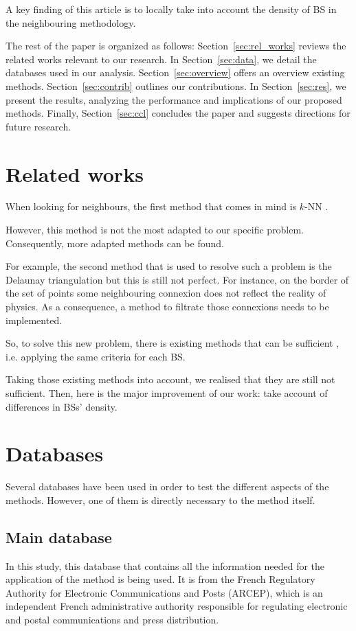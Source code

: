 \documentclass[lettersize,journal,english]{IEEEtran}
\begin{document}
    A key finding of this article is to locally take into account the density of BS in the neighbouring methodology.

    The rest of the paper is organized as follows: Section~\ref{sec:rel_works} reviews the related works relevant to our research. In Section~\ref{sec:data}, we detail the databases used in our analysis. Section~\ref{sec:overview} offers an overview existing methods. Section~\ref{sec:contrib} outlines our contributions. In Section~\ref{sec:res}, we present the results, analyzing the performance and implications of our proposed methods. Finally, Section~\ref{sec:ccl} concludes the paper and suggests directions for future research.

\section{Related works\label{sec:rel_works}}
    \noindent When looking for neighbours, the first method that comes in mind is $k$-NN \cite{10201211}.

    However, this method is not the most adapted to our specific problem. Consequently, more adapted methods can be found.

    For example, the second method that is used to resolve such a problem is the Delaunay triangulation \cite{delaunay_neighbor} but this is still not perfect. For instance, on the border of the set of points some neighbouring connexion does not reflect the reality of physics. As a consequence, a method to filtrate those connexions needs to be implemented.

    So, to solve this new problem, there is existing methods that can be sufficient \cite{art_del_paq, patent_neighs}, i.e. applying the same criteria for each BS.

    Taking those existing methods into account, we realised that they are still not sufficient. Then, here is the major improvement of our work: take account of differences in BSs' density.

\section{Databases\label{sec:data}}
    \noindent Several databases have been used in order to test the different aspects of the methods. However, one of them is directly necessary to the method itself.

    \subsection{Main database}
        In this study, this database \cite{main_database} that contains all the information needed for the application of the method is being used. It is from the French Regulatory Authority for Electronic Communications and Posts (ARCEP), which is an independent French administrative authority responsible for regulating electronic and postal communications and press distribution.
\end{document}

